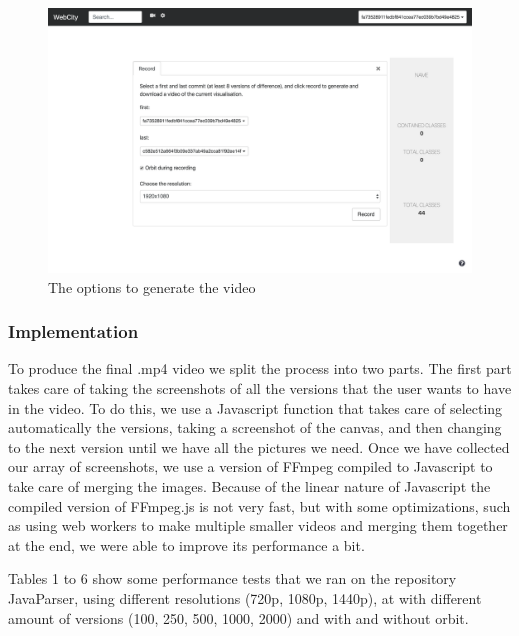 \documentclass[]{usiinfbachelorproject}
\begin{document}
\begin{figure} [H]
\centering
\includegraphics[width=1\textwidth]{pictures/record_card.png}
\caption{The options to generate the video}
\label{fig:record}
\end{figure}

\subsubsection{Implementation} \label{Implementation}

To produce the final .mp4 video we split the process into two parts.
The first part takes care of taking the screenshots of all the versions that the user wants to have in the video. To do this, we use a Javascript function that takes care of selecting automatically the versions, taking a screenshot of the canvas, and then changing to the next version until we have all the pictures we need.
Once we have collected our array of screenshots, we use a version of FFmpeg compiled to Javascript to take care of merging the images. Because of the linear nature of Javascript the compiled version of FFmpeg.js is not very fast, but with some optimizations, such as using web workers to make multiple smaller videos and merging them together at the end, we were able to improve its performance a bit.

Tables 1 to 6 show some performance tests that we ran on the repository JavaParser, using different resolutions (720p, 1080p, 1440p), at with different amount of versions (100, 250, 500, 1000, 2000) and with and without orbit.
\end{document}
